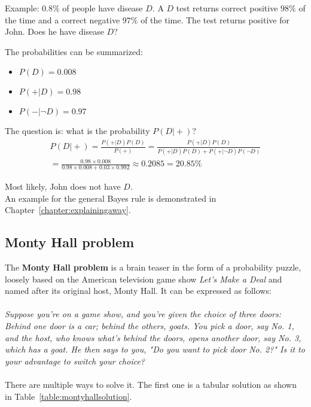 \documentclass{report}
\begin{document}
Example: $0.8\%$ of people have disease $D$. A $D$ test returns correct positive $98\%$ of the time and a correct negative $97\%$ of the time.
The test returns positive for John. Does he have disease $D$?

The probabilities can be summarized:
\begin{itemize}
\item $P(D) = 0.008$
\item $P(+\vert D) = 0.98$
\item $P(-\vert \neg D) = 0.97$
\end{itemize}

The question is: what is the probability $P(D\vert +)$?
\begin{align*}
P(D\vert +) = \frac{P(+\vert D)P(D)}{P(+)} = \frac{P(+\vert D)P(D)}{P(+\vert D)P(D) + P(+\vert \neg D)P(\neg D)} \\
= \frac{0.98 \times 0.008}{0.98 \times 0.008 + 0.03 \times 0.992} \approx 0.2085 = 20.85\%
\end{align*}

Most likely, John does not have $D$.
\\

An example for the general Bayes rule is demonstrated in Chapter~\ref{chapter:explainingaway}.

\subsection{Monty Hall problem}
The {\bf Monty Hall problem} is a brain teaser in the form of a probability puzzle, loosely based on the American television game show {\em Let's Make a Deal} and named after its original host, Monty Hall.
It can be expressed as follows:
\\
\\
{\em Suppose you're on a game show, and you're given the choice of three doors: Behind one door is a car; behind the others, goats. You pick a door, say No. 1, and the host, who knows what's behind the doors, opens another door, say No. 3, which has a goat. He then says to you, "Do you want to pick door No. 2?" Is it to your advantage to switch your choice?}
\\
\\
There are multiple ways to solve it. The first one is a tabular solution as shown in Table~\ref{table:montyhallsolution}.
\end{document}
